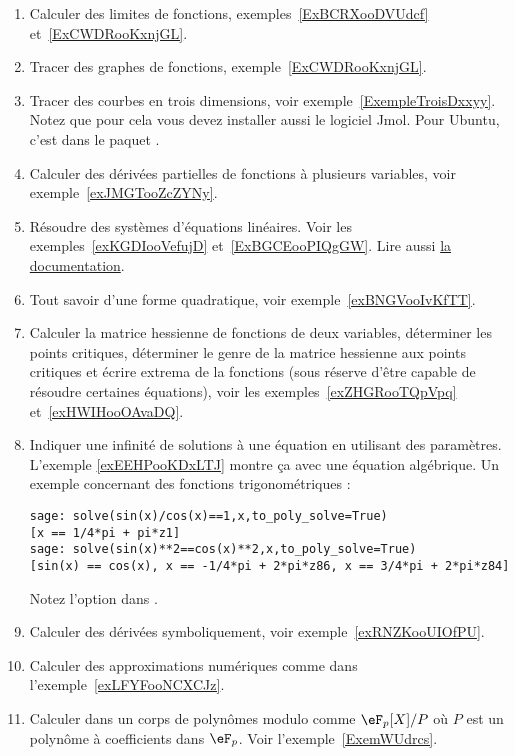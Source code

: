 \begin{enumerate}

	\item
        Calculer des limites de fonctions, exemples~\ref{ExBCRXooDVUdcf} et~\ref{ExCWDRooKxnjGL}.
	\item
        Tracer des graphes de fonctions, exemple~\ref{ExCWDRooKxnjGL}.
	\item
        Tracer des courbes en trois dimensions, voir exemple~\ref{ExempleTroisDxxyy}. Notez que pour cela vous devez installer aussi le logiciel Jmol. Pour Ubuntu, c'est dans le paquet .
	\item
		Calculer des dérivées partielles de fonctions à plusieurs variables, voir exemple~\ref{exJMGTooZcZYNy}.
	\item
        Résoudre des systèmes d'équations linéaires. Voir les exemples~\ref{exKGDIooVefujD} et~\ref{ExBGCEooPIQgGW}. Lire aussi \href{http://www.sagemath.org/doc/constructions/linear_algebra.html#solving-systems-of-linear-equations}{la documentation}.
	\item
        Tout savoir d'une forme quadratique, voir exemple~\ref{exBNGVooIvKfTT}.
	\item
        Calculer la matrice hessienne de fonctions de deux variables, déterminer les points critiques, déterminer le genre de la matrice hessienne aux points critiques et écrire extrema de la fonctions (sous réserve d'être capable de résoudre certaines équations), voir les exemples~\ref{exZHGRooTQpVpq} et~\ref{exHWIHooOAvaDQ}.
	\item
        Indiquer une infinité de solutions à une équation en utilisant des paramètres. L'exemple \ref{exEEHPooKDxLTJ} montre ça avec une équation algébrique. Un exemple concernant des fonctions trigonométriques :
        \begin{verbatim}
sage: solve(sin(x)/cos(x)==1,x,to_poly_solve=True)
[x == 1/4*pi + pi*z1]
sage: solve(sin(x)**2==cos(x)**2,x,to_poly_solve=True)
[sin(x) == cos(x), x == -1/4*pi + 2*pi*z86, x == 3/4*pi + 2*pi*z84]
        \end{verbatim}

        Notez l'option  dans .

	\item
        Calculer des dérivées symboliquement, voir exemple~\ref{exRNZKooUIOfPU}.
	\item
        Calculer des approximations numériques comme dans l'exemple~\ref{exLFYFooNCXCJz}.
    \item
        Calculer dans un corps de polynômes modulo comme \( \eF_p[X]/P\) où \( P\) est un polynôme à coefficients dans \( \eF_p\). Voir l'exemple~\ref{ExemWUdrcs}.
\end{enumerate}

